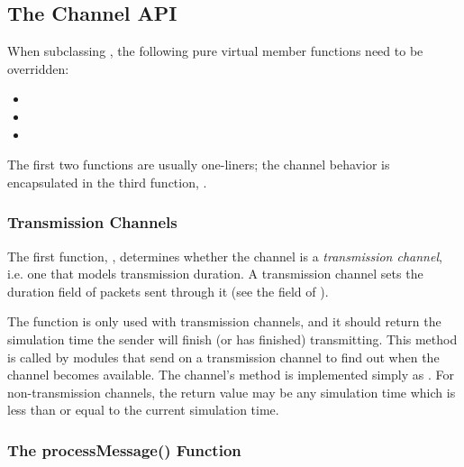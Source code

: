 \subsection{The Channel API}
\label{sec:simple-modules:channel-api}

When subclassing , the following pure virtual member functions
need to be overridden:

\begin{itemize}
  \item {}
  \item {}
  \item {}
\end{itemize}

The first two functions are usually one-liners; the channel behavior is
encapsulated in the third function, .

\subsubsection{Transmission Channels}
\label{sec:simple-modules:transmission-channels}

The first function, , determines whether
the channel is a \textit{transmission channel}, i.e. one that models
transmission duration. A transmission channel sets the duration field of
packets sent through it (see the  field of
).

The  function is only used with
transmission channels, and it should return the simulation time the sender
will finish (or has finished) transmitting. This method is called by
modules that send on a transmission channel to find out when the channel
becomes available. The channel's  method is implemented
simply as . For
non-transmission channels, the  return
value may be any simulation time which is less than or equal to the current
simulation time.

\subsubsection{The processMessage() Function}
\label{sec:simple-modules:channel-processmessage}


